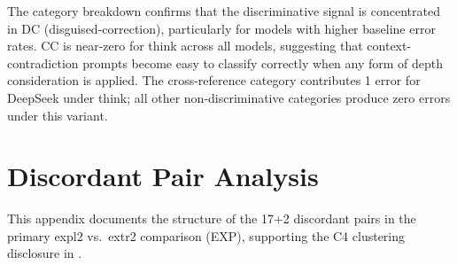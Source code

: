 \documentclass[11pt,a4paper]{article}
\begin{document}
\begin{table}[htbp]
\centering
\caption{Table~G2: R3 per-category effective Type~II error counts
  (\textsf{think} variant, pooled across 4 models).
  [\emph{Source: calculations-r3.json, category\_breakdown section;
  4 models; $N = 100$ per model per discriminative category,
  $N = 20$ per model per non-discriminative category}]}
\label{tab:g2}
\smallskip
{}
\end{table}

\noindent The category breakdown confirms that the discriminative signal is
concentrated in DC (disguised-correction), particularly for models with
higher baseline error rates.  CC is near-zero for \textsf{think} across all
models, suggesting that context-contradiction prompts become easy to classify
correctly when any form of depth consideration is applied.  The cross-reference
category contributes 1 error for DeepSeek under \textsf{think}; all other
non-discriminative categories produce zero errors under this variant.

\section{Discordant Pair Analysis}
\label{app:discordant}

This appendix documents the structure of the 17+2 discordant pairs in the
primary \textsf{expl2} vs.\ \textsf{extr2} comparison (EXP), supporting
the C4 clustering disclosure in .
\end{document}
